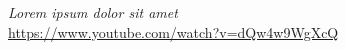 
\begin{thebibliography}{00}

  \textit{Lorem ipsum dolor sit amet} \\
  \url{https://www.youtube.com/watch?v=dQw4w9WgXcQ}

\end{thebibliography}


